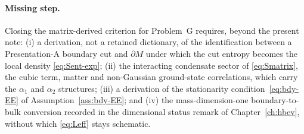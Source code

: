 \paragraph{Missing step.}
Closing the matrix-derived criterion for Problem~G requires, beyond the
present note: (i) a derivation, not a retained dictionary, of the
identification between a Presentation-A boundary cut and \(\partial M\) under
which the cut entropy becomes the local density \eqref{eq:Sent-exp}; (ii) the
interacting condensate sector of \eqref{eq:Smatrix}, the cubic term, matter
and non-Gaussian ground-state correlations, which carry the \(\alpha_1\) and
\(\alpha_2\) structures; (iii) a derivation of the stationarity
condition~\eqref{eq:bdy-EE} of Assumption~\ref{ass:bdy-EE}; and (iv) the
mass-dimension-one boundary-to-bulk conversion recorded in the dimensional
status remark of Chapter~\ref{ch:hbev}, without which \eqref{eq:Leff} stays
schematic.


